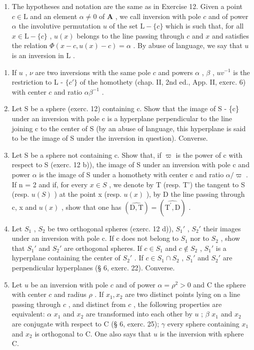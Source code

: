 \begin{enumerate}
\def\labelenumi{\arabic{enumi})}
\setcounter{enumi}{12}
\tightlist
\item
  The hypotheses and notation are the same as in Exercise 12. Given a point \(c \in \mathrm{L}\) and an element \(\alpha \neq 0\) of \(\mathbf{A}\) , we call inversion with pole \(c\) and of power \(\alpha\) the involutive permutation \(u\) of the set \(\mathrm{L} - \{c\}\) which is such that, for all \(x \in \mathrm{L} - \{c\}\) , \(u(x)\) belongs to the line passing through \(c\) and \(x\) and satisfies the relation \(\Phi(x - c, u(x) - c) = \alpha\) . By abuse of language, we say that \(u\) is an inversion in \(\mathrm{L}\) .
\end{enumerate}

\begin{enumerate}
\def\labelenumi{\alph{enumi})}
\item
  If \(u\) , \(\nu\) are two inversions with the same pole \(c\) and powers \(\alpha\) , \(\beta\) , \(uv^{-1}\) is the restriction to L - \(\{c'\}\) of the homothety (chap. II, 2nd ed., App. II, exerc. 6) with center \(c\) and ratio \(\alpha\beta^{-1}\) .
\item
  Let S be a sphere (exerc. 12) containing c. Show that the image of S - \{c\} under an inversion with pole c is a hyperplane perpendicular to the line joining c to the center of S (by an abuse of language, this hyperplane is said to be the image of S under the inversion in question). Converse.
\item
  Let S be a sphere not containing c. Show that, if \(\varpi\) is the power of c with respect to S (exerc. 12 b)), the image of S under an inversion with pole c and power \(\alpha\) is the image of S under a homothety with center c and ratio \(\alpha/\varpi\) . If n = 2 and if, for every \(x \in S\) , we denote by T (resp. T') the tangent to S (resp. \(u(S)\) ) at the point x (resp. \(u(x)\) ), by D the line passing through c, x and \(u(x)\) , show that one has \((\widehat{\mathrm{D},\mathrm{T}}) = (\widehat{\mathrm{T}^{\prime},\mathrm{D}})\) .
\item
  Let \(S_{1}\) , \(S_{2}\) be two orthogonal spheres (exerc. 12 d)), \(S_{1}'\) , \(S_{2}'\) their images under an inversion with pole c. If c does not belong to \(S_{1}\) nor to \(S_{2}\) , show that \(S_{1}'\) and \(S_{2}'\) are orthogonal spheres. If \(c \in S_{1}\) and \(c \notin S_{2}\) , \(S_{1}'\) is a hyperplane containing the center of \(S_{2}'\) . If \(c \in S_{1} \cap S_{2}\) , \(S_{1}'\) and \(S_{2}'\) are perpendicular hyperplanes (§ 6, exerc. 22). Converse.
\item
  Let \(u\) be an inversion with pole \(c\) and of power \(\alpha = \rho^2 > 0\) and C the sphere with center \(c\) and radius \(\rho\) . If \(x_1, x_2\) are two distinct points lying on a line passing through \(c\) , and distinct from \(c\) , the following properties are equivalent: \(\alpha\) \(x_1\) and \(x_2\) are transformed into each other by \(u\) ; \(\beta\) \(x_1\) and \(x_2\) are conjugate with respect to C (§ 6, exerc. 25); \(\gamma\) every sphere containing \(x_1\) and \(x_2\) is orthogonal to C. One also says that \(u\) is the inversion with sphere C.
\end{enumerate}

